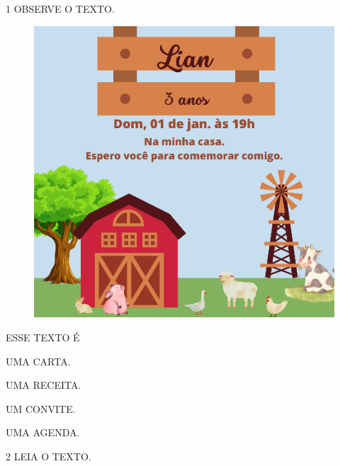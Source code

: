 \num{1} OBSERVE O TEXTO.

\vspace{0.5cm}

\begin{figure}[H]
\centering
\includegraphics[width=\textwidth]{media/image157.png}
\end{figure}

ESSE TEXTO É

\begin{escolha}
\item UMA CARTA.

\item UMA RECEITA.

\item UM CONVITE.

\item UMA AGENDA.
\end{escolha}

\num{2} LEIA O TEXTO.

\vspace{0.5cm}

